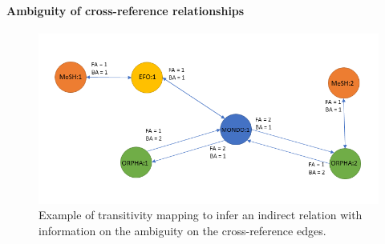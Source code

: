 \documentclass[9pt,a4paper,]{extarticle}
\begin{document}
\hypertarget{ambiguity-of-cross-reference-relationships}{%
\paragraph{Ambiguity of cross-reference relationships}\label{ambiguity-of-cross-reference-relationships}}

\begin{figure}

{\centering \includegraphics[width=1\linewidth]{fig/Figure3} 

}

\caption{Example of transitivity mapping to infer an indirect relation with information on the ambiguity on the cross-reference edges.}\label{fig:dodobafa}
\end{figure}
\end{document}
